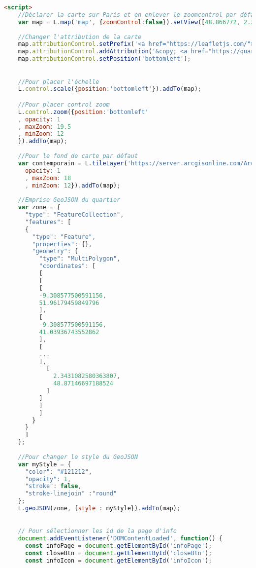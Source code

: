 \begin{lstlisting}[language=HTML, caption=Script JavaScript]
<script>    
    //Déclarer la carte sur Paris et en enlever le zoomcontrol par défaut
    var map = L.map('map', {zoomControl:false}).setView([48.866772, 2.338935], 12);    
    
    //Changer l'attribution de la carte      
    map.attributionControl.setPrefix('<a href="https://leafletjs.com/">Leaflet</a>');
    map.attributionControl.addAttribution('&copy; <a href="https://quartier-richelieu.inha.fr/">Richelieu.Histoire du quartier</a>, Marina Hervieu, 2024');
    map.attributionControl.setPosition('bottomleft');

   
    //Pour placer l'échelle
    L.control.scale({position:'bottomleft'}).addTo(map);

    //Pour placer control zoom
    L.control.zoom({position:'bottomleft'
    , opacity: 1
    , maxZoom: 19.5
    , minZoom: 12
    }).addTo(map);
  
    //Pour le fond de carte par défaut
    var contemporain = L.tileLayer('https://server.arcgisonline.com/ArcGIS/rest/services/World_Topo_Map/MapServer/tile/{z}/{y}/{x}', {
      opacity: 1
      , maxZoom: 18
      , minZoom: 12}).addTo(map);
    
    //Emprise GeoJSON du quartier  
    var zone = {
      "type": "FeatureCollection",
      "features": [
      {
        "type": "Feature",
        "properties": {},
        "geometry": {
          "type": "MultiPolygon",
          "coordinates": [
          [
          [
          [
          -9.308577500591156,
          51.96179459849796
          ],
          [
          -9.308577500591156,
          41.03936743552862
          ],
          [
          ...
          ],
            [
              2.3431082580363807,
              48.87146697188524
            ]
          ]
          ]
          ]
        }
      }
      ]
    };
    
    //Pour changer le style du GeoJSON
    var myStyle = {
      "color": "#121212",
      "opacity": 1,
      "stroke": false,
      "stroke-linejoin" :"round"
    };
    L.geoJSON(zone, {style : myStyle}).addTo(map);
    

    // Pour sélectionner les id de la page d'info
    document.addEventListener('DOMContentLoaded', function() {
      const infoPage = document.getElementById('infoPage');
      const closeBtn = document.getElementById('closeBtn');
      const infoIcon = document.getElementById('infoIcon');
      

\end{lstlisting}
